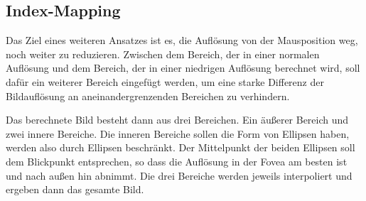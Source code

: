 \subsection{Index-Mapping}\label{ss::DDC}
Das Ziel eines weiteren Ansatzes ist es, die Auflösung von der Mausposition weg, noch weiter zu reduzieren.
Zwischen dem Bereich, der in einer normalen Auflösung und dem Bereich, der in einer niedrigen Auflösung berechnet wird, soll dafür ein weiterer Bereich eingefügt werden, um eine starke Differenz der Bildauflösung an aneinandergrenzenden Bereichen zu verhindern.

Das berechnete Bild besteht dann aus drei Bereichen.
Ein äußerer Bereich und zwei innere Bereiche.
Die inneren Bereiche sollen die Form von Ellipsen haben, werden also durch Ellipsen beschränkt.
Der Mittelpunkt der beiden Ellipsen soll dem Blickpunkt entsprechen, so dass die Auflösung in der Fovea am besten ist und nach außen hin abnimmt.
Die drei Bereiche werden jeweils interpoliert und ergeben dann das gesamte Bild.

